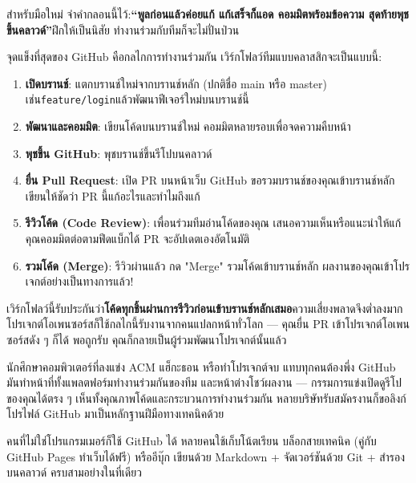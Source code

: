 สำหรับมือใหม่ จำคำกลอนนี้ไว้:\textbf{“พูลก่อนแล้วค่อยแก้ แก้เสร็จก็แอด คอมมิตพร้อมข้อความ สุดท้ายพุชขึ้นคลาวด์”}ฝึกให้เป็นนิสัย ทำงานร่วมกับทีมก็จะไม่ปั่นป่วน


จุดแข็งที่สุดของ GitHub คือกลไกการทำงานร่วมกัน เวิร์กโฟลว์ทีมแบบคลาสสิกจะเป็นแบบนี้:

\begin{enumerate}
  \item \textbf{เปิดบรานช์}: แตกบรานช์ใหม่จากบรานช์หลัก (ปกติชื่อ main หรือ master) เช่น\texttt{feature/\allowbreak login}แล้วพัฒนาฟีเจอร์ใหม่บนบรานช์นี้
  \item \textbf{พัฒนาและคอมมิต}: เขียนโค้ดบนบรานช์ใหม่ คอมมิตหลายรอบเพื่อจดความคืบหน้า
  \item \textbf{พุชขึ้น GitHub}: พุชบรานช์ขึ้นรีโปบนคลาวด์
  \item \textbf{ยื่น Pull Request}: เปิด PR บนหน้าเว็บ GitHub ขอรวมบรานช์ของคุณเข้าบรานช์หลัก เขียนให้ชัดว่า PR นี้แก้อะไรและทำไมถึงแก้
  \item \textbf{รีวิวโค้ด (Code Review)}: เพื่อนร่วมทีมอ่านโค้ดของคุณ เสนอความเห็นหรือแนะนำให้แก้ คุณคอมมิตต่อตามฟีดแบ็กได้ PR จะอัปเดตเองอัตโนมัติ
  \item \textbf{รวมโค้ด (Merge)}: รีวิวผ่านแล้ว กด "Merge" รวมโค้ดเข้าบรานช์หลัก ผลงานของคุณเข้าโปรเจกต์อย่างเป็นทางการแล้ว!
\end{enumerate}

เวิร์กโฟลว์นี้รับประกันว่า\textbf{โค้ดทุกชิ้นผ่านการรีวิวก่อนเข้าบรานช์หลักเสมอ}ความเสี่ยงพลาดจึงต่ำลงมาก โปรเจกต์โอเพนซอร์สก็ใช้กลไกนี้รับงานจากคนแปลกหน้าทั่วโลก — คุณยื่น PR เข้าโปรเจกต์โอเพนซอร์สดัง ๆ ก็ได้ พอถูกรับ คุณก็กลายเป็นผู้ร่วมพัฒนาโปรเจกต์นั้นแล้ว



นักศึกษาคอมพิวเตอร์ที่ลงแข่ง ACM แฮ็กะธอน หรือทำโปรเจกต์จบ แทบทุกคนต้องพึ่ง GitHub มันทำหน้าที่ทั้งแพลตฟอร์มทำงานร่วมกันของทีม และหน้าต่างโชว์ผลงาน — กรรมการแข่งเปิดดูรีโปของคุณได้ตรง ๆ เห็นทั้งคุณภาพโค้ดและกระบวนการทำงานร่วมกัน หลายบริษัทรับสมัครงานก็ขอลิงก์โปรไฟล์ GitHub มาเป็นหลักฐานฝีมือทางเทคนิคด้วย


คนที่ไม่ใช่โปรแกรมเมอร์ก็ใช้ GitHub ได้ หลายคนใช้เก็บโน้ตเรียน บล็อกสายเทคนิค (คู่กับ GitHub Pages ทำเว็บได้ฟรี) หรืออีบุ๊ก เขียนด้วย Markdown + จัดเวอร์ชันด้วย Git + สำรองบนคลาวด์ ครบสามอย่างในที่เดียว

